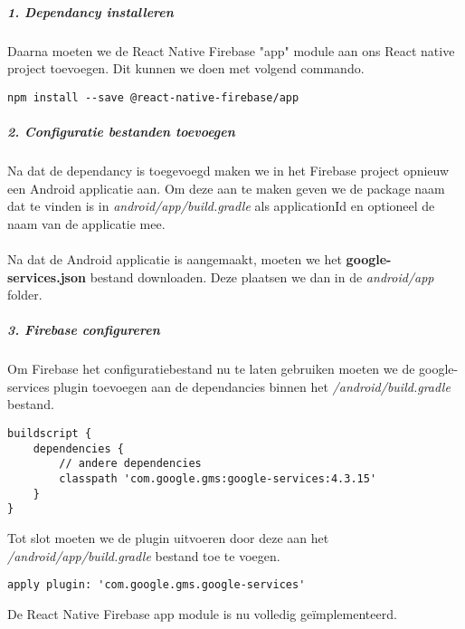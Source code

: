 \subparagraph{1. Dependancy installeren}
Daarna moeten we de React Native Firebase "app" module aan ons React native project toevoegen. 
Dit kunnen we doen met volgend commando.
\begin{verbatim}
npm install --save @react-native-firebase/app
\end{verbatim}

\subparagraph{2. Configuratie bestanden toevoegen}
Na dat de dependancy is toegevoegd maken we in het Firebase project opnieuw een Android applicatie aan. 
Om deze aan te maken geven we de package naam dat te vinden is in \textit{android/app/build.gradle} als 
applicationId en optioneel de naam van de applicatie mee.
\\\\
Na dat de Android applicatie is aangemaakt, moeten we het \textbf{google-services.json} bestand downloaden. 
Deze plaatsen we dan in de \textit{android/app} folder.

\subparagraph{3. Firebase configureren}
Om Firebase het configuratiebestand nu te laten gebruiken moeten we de google-services plugin toevoegen aan 
de dependancies binnen het \textit{/android/build.gradle} bestand. 
\begin{verbatim}
buildscript {
    dependencies {
        // andere dependencies
        classpath 'com.google.gms:google-services:4.3.15'
    }
}
\end{verbatim}
Tot slot moeten we de plugin uitvoeren door deze aan het \textit{/android/app/build.gradle} bestand toe te voegen.
\begin{verbatim}
apply plugin: 'com.google.gms.google-services'
\end{verbatim}
De React Native Firebase app module is nu volledig geïmplementeerd.